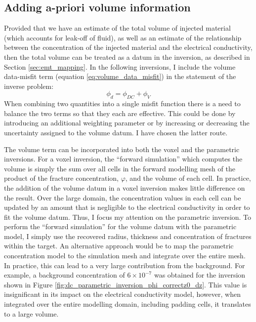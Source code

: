 \subsection{Adding a-priori volume information}
Provided that we have an estimate of the total volume of injected material (which accounts for leak-off of fluid), as well as an estimate of the relationship between the concentration of the injected material and the electrical conductivity, then the total volume can be treated as a datum in the inversion, as described in Section \ref{sec:emt_mapping}. In the following inversions, I include the volume data-misfit term (equation \ref{eq:volume_data_misfit}) in the statement of the inverse problem:
\begin{equation}
    \phi_d = \phi_{DC} + \phi_V
   \label{eq:data-misfit-with-volume}
\end{equation}
When combining two quantities into a single misfit function there is a need to balance the two terms so that they each are effective. This could be done by introducing an additional weighting parameter or by increasing or decreasing the uncertainty assigned to the volume datum. I have chosen the latter route.

The volume term can be incorporated into both the voxel and the parametric inversions. For a voxel inversion, the ``forward simulation'' which computes the volume is simply the sum over all cells in the forward modelling mesh of the product of the fracture concentration, $\varphi$, and the volume of each cell. In practice, the addition of the volume datum in a voxel inversion makes little difference on the result. Over the large domain, the concentration values in each cell can be updated by an amount that is negligible to the electrical conductivity in order to fit the volume datum. Thus, I focus my attention on the parametric inversion. To perform the ``forward simulation'' for the volume datum with the parametric model, I simply use the recovered radius, thickness and concentration of fractures within the target. An alternative approach would be to map the parametric concentration model to the simulation mesh and integrate over the entire mesh. In practice, this can lead to a very large contribution from the background. For example, a background concentration of $6 \times 10^{-7}$ was obtained for the inversion shown in Figure \ref{fig:dc_parametric_inversion_phi_correctz0_dz}. This value is insignificant in its impact on the electrical conductivity model, however, when integrated over the entire modelling domain, including padding cells, it translates to a large volume.

